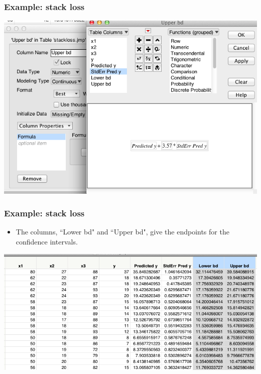 \documentclass[handout]{beamer}\usepackage{graphicx, color}
\numberwithin{equation}{section}
\begin{document}
\begin{frame}
\frametitle{Example: stack loss}
 \includegraphics{../../fig/msl2.png}
\end{frame}

\begin{frame}
\frametitle{Example: stack loss}
\begin{itemize}
\item The columns, ``Lower bd" and ``Upper bd", give the endpoints for the confidence intervals.
\end{itemize}
 \includegraphics{../../fig/msl3.png}
\end{frame}
\end{document}
